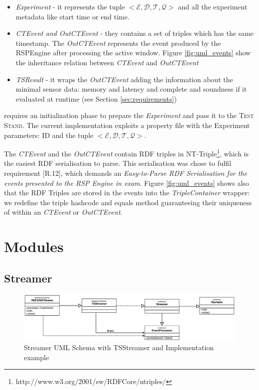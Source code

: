 \begin{itemize}
\item \textit{Experiment} - it represents the tuple $<\mathcal{E}, \mathcal{D},\mathcal{T},\mathcal{Q}>$ and all the experiment metadata like start time or end time.
\item \textit{CTEvent and OutCTEvent} - they contains a set of triples which has the same timestamp. The \textit{OutCTEvent} represents the event produced by the RSPEngine after processing the active window. Figure \ref{fig:uml_events} show the inheritance relation between \textit{CTEvent} and \textit{OutCTEvent}
\item \textit{TSResult} - it wraps the \textit{OutCTEvent} adding the information about the minimal sensor data: memory and latency and complete and soundness if it evaluated at runtime (see Section \ref{sec:requirements})
\end{itemize}

\name requires an initialization phase to prepare the \textit{Experiment} and pass it to the \textsc{Test Stand}. The current implementation exploits a property file with the Experiment parameters: ID and the tuple $<\mathcal{E}, \mathcal{D},\mathcal{T},\mathcal{Q}>$. 

The \textit{CTEvent} and the \textit{OutCTEvent} contain RDF triples in NT-Triple\footnote{http://www.w3.org/2001/sw/RDFCore/ntriples/}, which is the easiest RDF serialisation to parse. This serialisation was chose to fulfil requirement [R.12], which demands an \textit{Easy-to-Parse RDF Serialisation for the events presented to the RSP Engine in exam}. Figure \ref{fig:uml_events} shows also that the RDF Triples are stored in the events into the \textit{TripleContainer} wrapper: we redefine the triple hashcode and equals method guaranteeing their uniqueness of within an \textit{CTEvent} or \textit{OutCTEvent}.

\section{Modules}

\subsection{Streamer}	\label{sec:streamer-impl}
\begin{figure}[tbh]
  \centering
	\includegraphics[width=\linewidth]{images/uml_tstreamer}
	\caption{Streamer UML Schema with TSStreamer and Implementation example} 
  	\label{fig:uml_tstreamer}
\end{figure}

